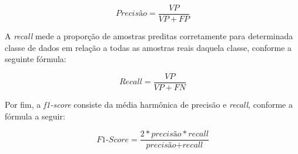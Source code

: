 \begin{center}
  \[
  \textit{Precisão} = \frac{VP}{VP + FP}
  \]
\end{center}

A \textit{recall} mede a proporção de amostras preditas corretamente para determinada classe de dados em relação a todas as amostras reais daquela classe, conforme a seguinte fórmula:

\begin{center}
  \[
  \textit{Recall} = \frac{VP}{VP + FN}
  \]
\end{center}

Por fim, a \textit{f1-score} consiste da média harmônica de precisão e \textit{recall}, conforme a fórmula a seguir:

\begin{center}
  \[
  \textit{F1-Score} = \frac{2 * \textit{precisão} * \textit{recall}}{\textit{precisão} + \textit{recall}}
  \]
\end{center}
